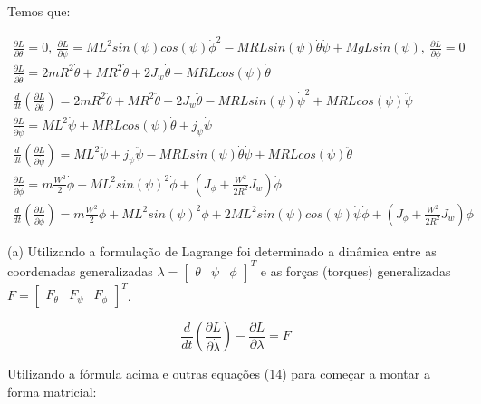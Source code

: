 \documentclass[10pt]{article}
\begin{document}
\quad Temos que:

\begin{equation}
\begin{gathered}
    \frac{\partial L}{ \partial \theta} = 0, \ \frac{\partial L}{ \partial \psi} = ML^2sin(\psi)cos(\psi)\dot{\phi}^2 - MRLsin(\psi)\dot{\theta}\dot{\psi} + MgLsin(\psi), \ \frac{\partial L}{ \partial \phi} = 0 \\
    \frac{\partial L}{ \partial \dot{\theta}} = 2mR^2\dot{\theta} + MR^2\dot{\theta} + 2J_w\dot{\theta} + MRLcos(\psi)\dot{\theta} \\
    \frac{d}{dt} \left(\frac{\partial L}{ \partial \dot{\theta}}\right) = 2mR^2\ddot{\theta} + MR^2\ddot{\theta} + 2J_w\ddot{\theta} - MRLsin(\psi)\dot{\psi}^2 + MRLcos(\psi)\ddot{\psi} \\
    \frac{\partial L}{ \partial \dot{\psi}} = ML^2\dot{\psi} + MRLcos(\psi)\dot{\theta} + j_\psi \dot{\psi} \\
    \frac{d}{dt} \left(\frac{\partial L}{ \partial \dot{\psi}}\right) = ML^2\ddot{\psi} + j_\psi \ddot{\psi} - MRLsin(\psi)\dot{\theta}\dot{\psi} + MRLcos(\psi)\ddot{\theta} \\
    \frac{\partial L}{ \partial \dot{\phi}} = m\frac{W^2}{2}\dot{\phi} + ML^2sin(\psi)^2\dot{\phi} + \left( J_{\phi} + \frac{W^2}{2R^2} J_w \right) \dot{\phi} \\
    \frac{d}{dt} \left(\frac{\partial L}{ \partial \dot{\phi}}\right) = m\frac{W^2}{2}\ddot{\phi} + ML^2sin(\psi)^2\ddot{\phi} + 2ML^2sin(\psi)cos(\psi)\dot\psi\dot\phi + \left( J_{\phi} + \frac{W^2}{2R^2} J_w \right) \ddot{\phi}
\end{gathered}
\end{equation}

\quad (a) Utilizando a formulação de Lagrange foi determinado a dinâmica entre as coordenadas generalizadas $\lambda = \begin{bmatrix} \theta & \psi & \phi \end{bmatrix}^T$ e
as forças (torques) generalizadas $F = \begin{bmatrix} F_{\theta} & F_{\psi} & F_{\phi} \end{bmatrix}^T$.

\begin{equation}
    \frac{d}{dt}\left(\frac{\partial L}{\partial \dot{\lambda}}\right) - \frac{\partial L}{\partial \lambda} = F
\end{equation}

\quad Utilizando a fórmula acima e outras equações (14) para começar a montar a forma matricial:
\end{document}
